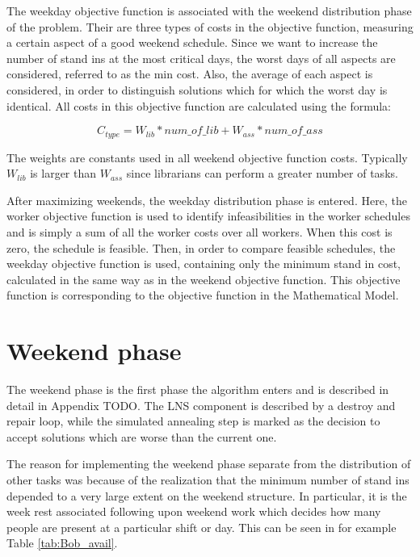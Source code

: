 The weekday objective function is associated with the weekend distribution phase of the problem. Their are three types of costs in the objective function, measuring a certain aspect of a good weekend schedule. Since we want to increase the number of stand ins at the most critical days, the worst days of all aspects are considered, referred to as the min cost. Also, the average of each aspect is considered, in order to distinguish solutions which for which the worst day is identical. All costs in this objective function are calculated using the formula:

\begin{equation}
\label{eq:wend_cost_calc}
C_{type} = W_{lib}*num\_of\_lib + W_{ass}*num\_of\_ass
\end{equation}

The weights are constants used in all weekend objective function costs. Typically $W_{lib}$ is larger than $W_{ass}$ since librarians can perform a greater number of tasks.

After maximizing weekends, the weekday distribution phase is entered. Here, the worker objective function is used to identify infeasibilities in the worker schedules and is simply a sum of all the worker costs over all workers. When this cost is zero, the schedule is feasible. Then, in order to compare feasible schedules, the weekday objective function is used, containing only the minimum stand in cost, calculated in the same way as in the weekend objective function. This objective function is corresponding to the objective function in the Mathematical Model.

\section{Weekend phase}

The weekend phase is the first phase the algorithm enters and is described in detail in Appendix TODO. The LNS component is described by a destroy and repair loop, while the simulated annealing step is marked as the decision to accept solutions which are worse than the current one.

The reason for implementing the weekend phase separate from the distribution of other tasks was because of the realization that the minimum number of stand ins depended to a very large extent on the weekend structure. In particular, it is the week rest associated following upon weekend work which decides how many people are present at a particular shift or day. This can be seen in for example Table \ref{tab:Bob_avail}.

